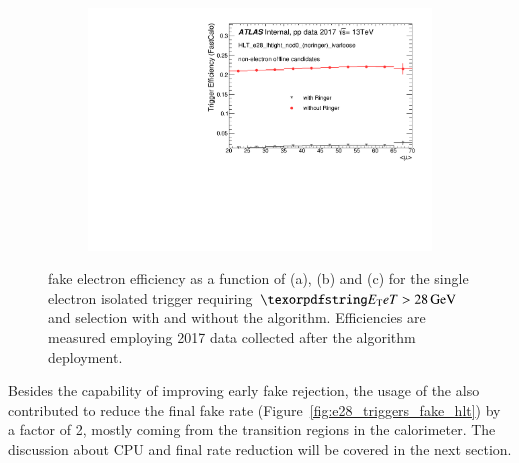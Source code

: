 \begin{figure}[h!tb]
\begin{center}
\begin{subfigure}[c]{.58\textwidth}
  \caption{}
  \end{subfigure}\\
  \begin{subfigure}[c]{.58\textwidth}
  \centering
  \includegraphics[width=\textwidth]{sections/04_operation/figures/efficiencies/eff_EGAM7_e28_ringer_and_noringer_2017_after_ts1_L2Calo_mu.pdf}
  \caption{}
  \end{subfigure}
  \caption{\label{fig:e28_triggers_fake} \fastcalo %
  fake electron efficiency as a function of \et (a), \eta (b) and \avgmu (c) for the single electron isolated trigger requiring $\et > \SI{28}{\GeV}$ and \tight selection with and without the \rnn{} algorithm. Efficiencies are measured employing 2017 data collected after the \rnn algorithm deployment.}%
  
  \end{center}
\end{figure}



Besides the capability of improving early fake rejection, the usage of the
\rnn{} also contributed to reduce the final fake rate
(Figure~\ref{fig:e28_triggers_fake_hlt}) by a factor of 2, mostly coming from
the transition regions in the calorimeter. The discussion about CPU and final rate reduction will be covered in the next section.


